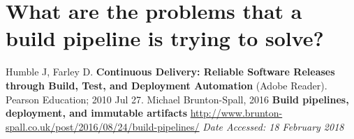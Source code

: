 \documentclass{article}
\newcommand{\question}[1]{\section{#1}}
\begin{document}
\question{What are the problems that a build pipeline is trying to solve?}


{\footnotesize
\begin{thebibliography}{5}
    Humble J, Farley D. \textbf{Continuous Delivery: Reliable Software Releases through Build, Test, and Deployment Automation}
    (Adobe Reader). Pearson Education; 2010 Jul 27.
    Michael Brunton-Spall, 2016
    \textbf{Build pipelines, deployment, and immutable artifacts}
    \url{http://www.brunton-spall.co.uk/post/2016/08/24/build-pipelines/}
    \textit{Date Accessed: 18 February 2018}

\end{thebibliography}
}

\clearpage
\question{}

\end{document}
